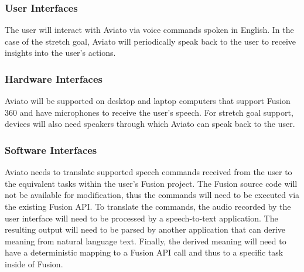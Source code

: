\documentclass[onecolumn, draftclsnofoot,10pt, compsoc]{IEEEtran}
\def \botname{Aviato }
\begin{document}
        \subsubsection{User Interfaces}
            The user will interact with \botname via voice commands spoken in English. 
            In the case of the stretch goal, \botname will periodically speak back to the user to receive insights into the user's actions.

        \subsubsection{Hardware Interfaces} %
            \botname will be supported on desktop and laptop computers that support Fusion 360 and have microphones to receive the user's speech.
            For stretch goal support, devices will also need speakers through which \botname can speak back to the user.

        \subsubsection{Software Interfaces}               
            \botname needs to translate supported speech commands received from the user to the equivalent tasks within the user's Fusion project.
            The Fusion source code will not be available for modification, thus the commands will need to be executed via the existing Fusion API.
            To translate the commands, the audio recorded by the user interface will need to be processed by a speech-to-text application.
            The resulting output will need to be parsed by another application that can derive meaning from natural language text.
            Finally, the derived meaning will need to have a deterministic mapping to a Fusion API call and thus to a specific task inside of Fusion.
\end{document}
